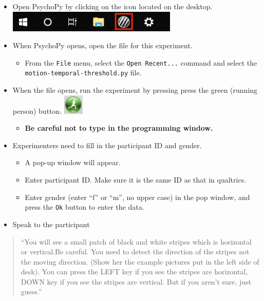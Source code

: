\documentclass[]{article}
\providecommand{\tightlist}{%
  \setlength{\itemsep}{0pt}\setlength{\parskip}{0pt}}
\begin{document}
\begin{itemize}
\tightlist
\item
  Open PsychoPy by clicking on the icon located on the desktop.
  \includegraphics{images/PsychoPy-1.PNG}\\
\item
  When PsychoPy opens, open the file for this experiment.

  \begin{itemize}
  \tightlist
  \item
    From the \texttt{File} menu, select the \texttt{Open\ Recent...}
    command and select the \texttt{motion-temporal-threshold.py} file.
  \end{itemize}
\item
  When the file opens, run the experiment by pressing press the green
  (running person) button. \includegraphics{images/PPrunningMan.png}

  \begin{itemize}
  \tightlist
  \item
    \textbf{Be careful not to type in the programming window.}
  \end{itemize}
\item
  Experimenters need to fill in the participant ID and gender.

  \begin{itemize}
  \tightlist
  \item
    A pop-up window will appear.
  \item
    Enter participant ID. Make sure it is the same ID as that in
    qualtrics.
  \item
    Enter gender (enter ``f'' or ``m'', no upper case) in the pop
    window, and press the \texttt{Ok} button to enter the data.
  \end{itemize}
\item
  Speak to the participant
\end{itemize}

\begin{quote}
``You will see a small patch of black and white stripes which is
horizontal or vertical.Be careful. You need to detect the direction of
the stripes not the moving direction. (Show her the example pictures put
in the left side of desk). You can press the LEFT key if you see the
stripes are horizontal, DOWN key if you see the stripes are vertical.
But if you aren't sure, just guess.''
\end{quote}
\end{document}
